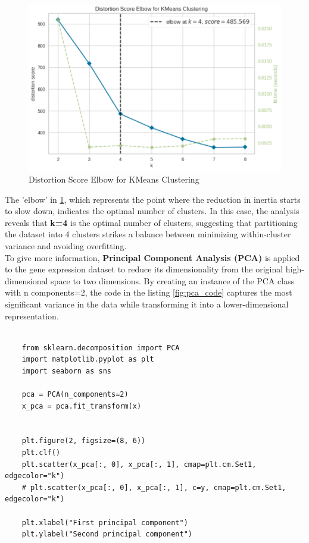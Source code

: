 \documentclass{article}
\begin{document}
\begin{figure}[H]
	\centering
	\includegraphics[width=\textwidth]{images/elbow.png}
	\caption{Distortion Score Elbow for KMeans Clustering}
	\label{fig:elbow}
\end{figure}



 The 'elbow' in \ref{fig:elbow}, which represents the point where the reduction in inertia starts to slow down, indicates the optimal number of clusters. In this case, the analysis reveals that \textbf{k=4} is the optimal number of clusters, suggesting that partitioning the dataset into 4 clusters strikes a balance between minimizing within-cluster variance and avoiding overfitting. 
\\

To give more information, \textbf{Principal Component Analysis (PCA)} is applied to the gene expression dataset to reduce its dimensionality from the original high-dimensional space to two dimensions. By creating an instance of the PCA class with n components=2, the code in the listing \ref{fig:pca_code} captures the most significant variance in the data while transforming it into a lower-dimensional representation. 
\\

\begin{lstlisting}[style=mypython, label=fig:pca_code,caption=Application of PCA method]
	
	from sklearn.decomposition import PCA
	import matplotlib.pyplot as plt
	import seaborn as sns
	
	pca = PCA(n_components=2)
	x_pca = pca.fit_transform(x)
	
	
	plt.figure(2, figsize=(8, 6))
	plt.clf()
	plt.scatter(x_pca[:, 0], x_pca[:, 1], cmap=plt.cm.Set1, edgecolor="k")
	# plt.scatter(x_pca[:, 0], x_pca[:, 1], c=y, cmap=plt.cm.Set1, edgecolor="k")
	
	plt.xlabel("First principal component")
	plt.ylabel("Second principal component")	
\end{lstlisting}
\end{document}
